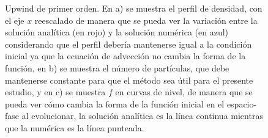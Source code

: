\documentclass[11pt,twoside,openright,spanish]{report}
\numberwithin{equation}{chapter}
\numberwithin{figure}{chapter}
\numberwithin{table}{chapter}
\begin{document}
\begin{figure}[p]
	\caption{Upwind de  primer orden. En a) se muestra el perfil de densidad, con el eje $x$ reescalado de manera que se pueda ver la variación entre la solución analítica (en rojo) y la solución numérica (en azul) considerando que el perfil debería mantenerse igual a la condición inicial ya que la ecuación de advección no cambia la forma de la función, en b) se muestra el número de partículas, que debe mantenerse constante para que el método sea útil para el presente estudio, y en c) se muestra $f$ en curvas de nivel, de manera que se pueda ver cómo cambia la forma de la función inicial en el espacio-fase al evolucionar, la solución analítica es la línea continua mientras que la numérica es la línea punteada.} 
	\label{upwind1}
\end{figure}
\end{document}
